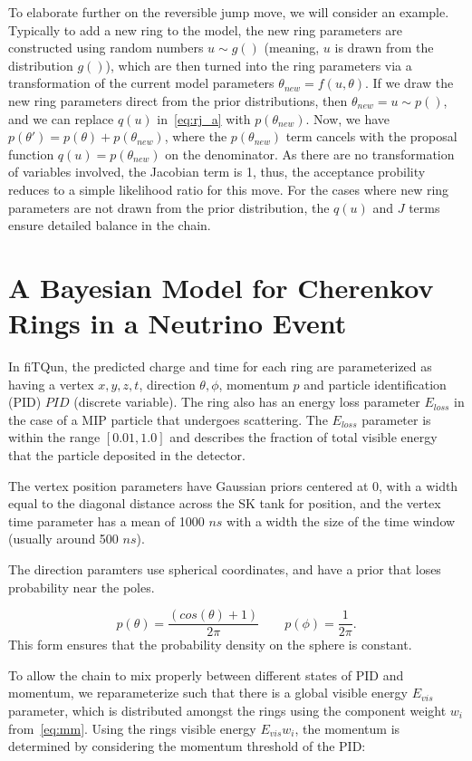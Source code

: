 \documentclass[11pt]{article} %
\begin{document}
To elaborate further on the reversible jump move, we will consider an example. Typically to add a new ring to the model, the new ring parameters are constructed using random numbers $u\sim g()$ (meaning, $u$ is drawn from the distribution $g()$), which are then turned into the ring parameters via a transformation of the current model parameters $\theta_{new} = f(u,\theta)$. If we draw the new ring parameters direct from the prior distributions, then $\theta_{new} = u\sim p()$, and we can replace $q(u)$ in~\ref{eq:rj_a} with $p(\theta_{new})$. Now, we have $p(\theta')=p(\theta)+p(\theta_{new})$, where the $p(\theta_{new})$ term cancels with the proposal function $q(u) = p(\theta_{new})$ on the denominator. As there are no transformation of variables involved, the Jacobian term is 1, thus, the acceptance probility reduces to a simple likelihood ratio for this move. For the cases where new ring parameters are not drawn from the prior distribution, the $q(u)$ and $J$ terms ensure detailed balance in the chain.

\section{A Bayesian Model for Cherenkov Rings in a Neutrino Event}
In fiTQun, the predicted charge and time for each ring are parameterized as having a vertex $x,y,z,t$, direction $\theta,\phi$, momentum $p$ and particle identification (PID) $PID$ (discrete variable). The ring also has an energy loss parameter $E_{loss}$ in the case of a MIP particle that undergoes scattering. The $E_{loss}$ parameter is within the range $[0.01,1.0]$ and describes the fraction of total visible energy that the particle deposited in the detector.

The vertex position parameters have Gaussian priors centered at 0, with a width equal to the diagonal distance across the SK tank for position, and the vertex time parameter has a mean of 1000 $ns$ with a width the size of the time window (usually around 500 $ns$).

The direction paramters use spherical coordinates, and have a prior that loses probability near the poles.

\begin{equation}
p(\theta) = \frac{(cos(\theta) + 1)}{2\pi}\qquad p(\phi) = \frac{1}{2\pi}.
\end{equation}
This form ensures that the probability density on the sphere is constant.

To allow the chain to mix properly between different states of PID and momentum, we reparameterize such that there is a global visible energy $E_{vis}$ parameter, which is distributed amongst the rings using the component weight $w_{i}$ from~\ref{eq:mm}. Using the rings visible energy $E_{vis}w_{i}$, the momentum is determined by considering the momentum threshold of the PID:
\end{document}
